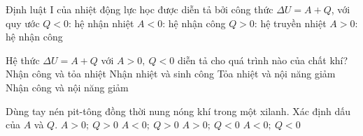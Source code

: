 \begin{ex}%
	Định luật I của nhiệt động lực học được diễn tả bởi công thức $\Delta U = A + Q$, với quy ước
	\choice
	{$Q < 0$: hệ nhận nhiệt}
	{$A < 0$: hệ nhận công}
	{$Q > 0$: hệ truyền nhiệt}
	{\True $A > 0$: hệ nhận công}
	
	\end{ex}


\begin{ex}%
	Hệ thức $\Delta U = A+Q$ với $A > 0,\ Q < 0$ diễn tả cho quá trình nào của chất khí?
	\choice
	{\True Nhận công và tỏa nhiệt}
	{Nhận nhiệt và sinh công}
	{Tỏa nhiệt và nội năng giảm}
	{Nhận công và nội năng giảm}
	
	\end{ex}

\begin{ex}
	Dùng tay nén pit-tông đồng thời nung nóng khí trong một xilanh. Xác định dấu của $A$ và $Q$.
	\choice
	{\True $A > 0;~Q > 0$}
	{$A < 0;~Q > 0$}
	{$A > 0;~Q < 0$}
	{$A < 0;~Q < 0$}
\end{ex}

